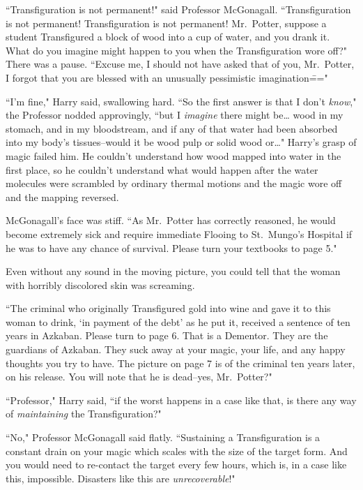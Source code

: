 
``Transfiguration is not permanent!" said Professor McGonagall. ``Transfiguration is not permanent! Transfiguration is not permanent! Mr.~Potter, suppose a student Transfigured a block of wood into a cup of water, and you drank it. What do you imagine might happen to you when the Transfiguration wore off?" There was a pause. ``Excuse me, I should not have asked that of you, Mr.~Potter, I forgot that you are blessed with an unusually pessimistic imagination\==="

``I'm fine," Harry said, swallowing hard. ``So the first answer is that I don't \emph{know}," the Professor nodded approvingly, ``but I \emph{imagine} there might be{\ldots} wood in my stomach, and in my bloodstream, and if any of that water had been absorbed into my body's tissues\---would it be wood pulp or solid wood or{\ldots}" Harry's grasp of magic failed him. He couldn't understand how wood mapped into water in the first place, so he couldn't understand what would happen after the water molecules were scrambled by ordinary thermal motions and the magic wore off and the mapping reversed.

McGonagall's face was stiff. ``As Mr.~Potter has correctly reasoned, he would become extremely sick and require immediate Flooing to St.~Mungo's Hospital if he was to have any chance of survival. Please turn your textbooks to page 5."

Even without any sound in the moving picture, you could tell that the woman with horribly discolored skin was screaming.

``The criminal who originally Transfigured gold into wine and gave it to this woman to drink, `in payment of the debt' as he put it, received a sentence of ten years in Azkaban. Please turn to page 6. That is a Dementor. They are the guardians of Azkaban. They suck away at your magic, your life, and any happy thoughts you try to have. The picture on page 7 is of the criminal ten years later, on his release. You will note that he is dead\---yes, Mr.~Potter?"

``Professor," Harry said, ``if the worst happens in a case like that, is there any way of \emph{maintaining} the Transfiguration?"

``No," Professor McGonagall said flatly. ``Sustaining a Transfiguration is a constant drain on your magic which scales with the size of the target form. And you would need to re-contact the target every few hours, which is, in a case like this, impossible. Disasters like this are \emph{unrecoverable}!"

